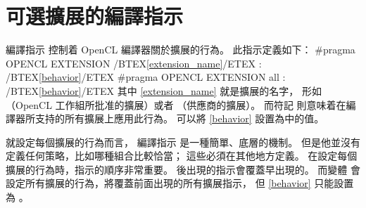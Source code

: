 \section{可選擴展的編譯指示}

編譯指示  控制着 OpenCL 編譯器關於擴展的行為。
此指示定義如下：
\startclc[indentnext=no]
#pragma OPENCL EXTENSION /BTEX\cref{extension_name}/ETEX : /BTEX\cref{behavior}/ETEX
#pragma OPENCL EXTENSION all : /BTEX\cref{behavior}/ETEX
\stopclc
其中 \cref{extension_name} 就是擴展的名字，
形如 （OpenCL 工作組所批准的擴展）或者 （供應商的擴展）。
而符記  則意味着在編譯器所支持的所有擴展上應用此行為。
可以將 \cref{behavior} 設置為中的值。

{}

就設定每個擴展的行為而言，
編譯指示  是一種簡單、底層的機制。
但是他並沒有定義任何策略，比如哪種組合比較恰當；
這些必須在其他地方定義。
在設定每個擴展的行為時，指示的順序非常重要。
後出現的指示會覆蓋早出現的。
而變體  會設定所有擴展的行為，將覆蓋前面出現的所有擴展指示，
但 \cref{behavior} 只能設置為 。